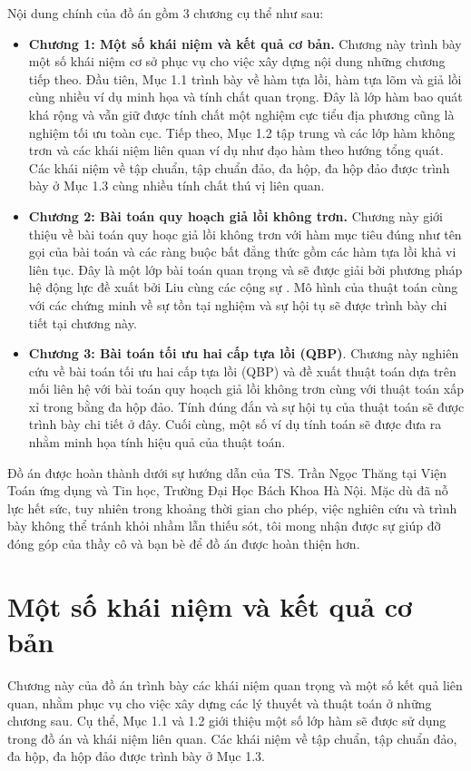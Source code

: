 \documentclass[oneside, a4paper]{book}
\theoremstyle{plain}
\theoremstyle{definition}
\theoremstyle{remark}
\begin{document}
Nội dung chính của đồ án gồm 3 chương cụ thể như sau:
\begin{itemize}
	\item \textbf{Chương 1: Một số khái niệm và kết quả cơ bản.} Chương này trình bày một số khái niệm cơ sở phục vụ cho việc xây dựng nội
	dung những chương tiếp theo. Đầu tiên, Mục 1.1 trình bày về hàm
	tựa lồi, hàm tựa lõm và giả lồi cùng nhiều ví dụ minh họa và tính chất quan trọng. Đây là lớp hàm bao quát khá rộng và vẫn giữ được tính chất một nghiệm cực tiểu địa phương cũng là nghiệm tối ưu toàn cục. Tiếp theo, Mục 1.2 tập trung và các lớp hàm không trơn và các khái niệm liên quan ví dụ như đạo hàm theo hướng tổng quát. Các khái niệm về tập chuẩn, tập chuẩn đảo, đa hộp, đa hộp đảo được trình bày ở Mục 1.3 cùng nhiều tính chất thú vị liên quan.
	\item \textbf{Chương 2: Bài toán quy hoạch giả lồi không trơn.} Chương này giới thiệu về bài toán quy hoạc giả lồi không trơn với hàm mục tiêu đúng như tên gọi của bài toán và các ràng buộc bất đẳng thức gồm các hàm tựa lồi khả vi liên tục. Đây là một lớp bài toán quan trọng và sẽ được giải bởi phương pháp hệ động lực đề xuất bởi Liu cùng các cộng sự \cite{Liu2021}. Mô hình của thuật toán cùng với các chứng minh về sự tồn tại nghiệm và sự hội tụ sẽ được trình bày chi tiết tại chương này.
	\item \textbf{Chương 3: Bài toán tối ưu hai cấp tựa lồi (QBP)}. Chương này nghiên cứu về bài toán tối ưu hai cấp tựa lồi (QBP) và đề xuất thuật toán dựa trên mối liên hệ với bài toán quy hoạch giả lồi không trơn cùng với thuật toán xấp xỉ trong bằng đa hộp đảo. Tính đúng đắn và sự hội tụ của thuật toán sẽ được trình bày chi tiết ở đây. Cuối cùng, một số ví dụ tính toán sẽ được đưa ra nhằm minh họa tính hiệu quả của thuật toán.
\end{itemize}

\indent Đồ án được hoàn thành dưới sự hướng dẫn của TS. Trần Ngọc Thăng
tại Viện Toán ứng dụng và Tin học, Trường Đại Học Bách Khoa Hà Nội.
Mặc dù đã nỗ lực hết sức, tuy nhiên trong khoảng thời gian cho phép,
việc nghiên cứu và trình bày không thể tránh khỏi nhầm lẫn thiếu sót,
tôi mong nhận được sự giúp đỡ đóng góp của thầy cô và bạn bè để đồ
án được hoàn thiện hơn.

\chapter{Một số khái niệm và kết quả cơ bản}
Chương này của đồ án trình bày các khái niệm quan trọng và một số kết
quả liên quan, nhằm phục vụ cho việc xây dựng các lý thuyết và thuật
toán ở những chương sau. Cụ thể, Mục 1.1 và 1.2 giới thiệu một số lớp
hàm sẽ được sử dụng trong đồ án và khái niệm liên quan. Các khái
niệm về tập chuẩn, tập chuẩn đảo, đa hộp, đa hộp đảo được trình bày ở
Mục 1.3.


% 

\end{document}
